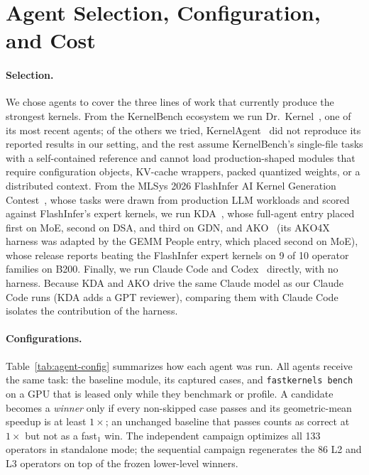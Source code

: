 \section{Agent Selection, Configuration, and Cost}
\label{app:agents}

\paragraph{Selection.}
We chose agents to cover the three lines of work that currently produce the strongest kernels.
From the KernelBench ecosystem we run Dr.~Kernel~\citep{drkernel}, one of its most recent agents; of the others we tried, KernelAgent~\citep{kernelagent} did not reproduce its reported results in our setting, and the rest assume KernelBench's single-file tasks with a self-contained reference and cannot load production-shaped modules that require configuration objects, KV-cache wrappers, packed quantized weights, or a distributed context.
From the MLSys 2026 FlashInfer AI Kernel Generation Contest~\citep{mlsys26contest}, whose tasks were drawn from production LLM workloads and scored against FlashInfer's expert kernels, we run KDA~\citep{kda}, whose full-agent entry placed first on MoE, second on DSA, and third on GDN, and AKO~\citep{ako} (its AKO4X harness was adapted by the GEMM People entry, which placed second on MoE), whose release reports beating the FlashInfer expert kernels on 9 of 10 operator families on B200.
Finally, we run Claude Code and Codex~\citep{codex} directly, with no harness.
Because KDA and AKO drive the same Claude model as our Claude Code runs (KDA adds a GPT reviewer), comparing them with Claude Code isolates the contribution of the harness.

\paragraph{Configurations.}
Table~\ref{tab:agent-config} summarizes how each agent was run.
All agents receive the same task: the baseline module, its captured cases, and \texttt{fastkernels bench} on a GPU that is leased only while they benchmark or profile.
A candidate becomes a \emph{winner} only if every non-skipped case passes and its geometric-mean speedup is at least $1\times$; an unchanged baseline that passes counts as correct at $1\times$ but not as a fast$_1$ win.
The independent campaign optimizes all 133 operators in standalone mode; the sequential campaign regenerates the 86 L2 and L3 operators on top of the frozen lower-level winners.

